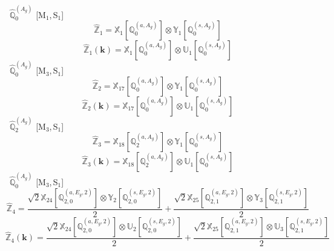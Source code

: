 \documentclass[fleqn,10pt,landscape]{article}
\begin{document}
\begin{itemize}
\vspace{4mm}
\noindent {} $\,\,\,\hat{\mathbb{Q}}_{0}^{(A_{g})}$ [M$_{1}$,\,S$_{1}$]
\begin{dmath*}
\hat{\mathbb{Z}}_{1}=\mathbb{X}_{1}[\mathbb{Q}_{0}^{(a,A_{g})}] \otimes\mathbb{Y}_{1}[\mathbb{Q}_{0}^{(s,A_{g})}]
\end{dmath*}
\begin{dmath*}
\hat{\mathbb{Z}}_{1}(\bm{k})=\mathbb{X}_{1}[\mathbb{Q}_{0}^{(a,A_{g})}] \otimes\mathbb{U}_{1}[\mathbb{Q}_{0}^{(s,A_{g})}]
\end{dmath*}
\vspace{4mm}
\noindent {} $\,\,\,\hat{\mathbb{Q}}_{0}^{(A_{g})}$ [M$_{3}$,\,S$_{1}$]
\begin{dmath*}
\hat{\mathbb{Z}}_{2}=\mathbb{X}_{17}[\mathbb{Q}_{0}^{(a,A_{g})}] \otimes\mathbb{Y}_{1}[\mathbb{Q}_{0}^{(s,A_{g})}]
\end{dmath*}
\begin{dmath*}
\hat{\mathbb{Z}}_{2}(\bm{k})=\mathbb{X}_{17}[\mathbb{Q}_{0}^{(a,A_{g})}] \otimes\mathbb{U}_{1}[\mathbb{Q}_{0}^{(s,A_{g})}]
\end{dmath*}
\vspace{4mm}
\noindent {} $\,\,\,\hat{\mathbb{Q}}_{2}^{(A_{g})}$ [M$_{3}$,\,S$_{1}$]
\begin{dmath*}
\hat{\mathbb{Z}}_{3}=\mathbb{X}_{18}[\mathbb{Q}_{2}^{(a,A_{g})}] \otimes\mathbb{Y}_{1}[\mathbb{Q}_{0}^{(s,A_{g})}]
\end{dmath*}
\begin{dmath*}
\hat{\mathbb{Z}}_{3}(\bm{k})=\mathbb{X}_{18}[\mathbb{Q}_{2}^{(a,A_{g})}] \otimes\mathbb{U}_{1}[\mathbb{Q}_{0}^{(s,A_{g})}]
\end{dmath*}
\vspace{4mm}
\noindent {} $\,\,\,\hat{\mathbb{Q}}_{0}^{(A_{g})}$ [M$_{3}$,\,S$_{1}$]
\begin{dmath*}
\hat{\mathbb{Z}}_{4}=\frac{\sqrt{2} \mathbb{X}_{24}[\mathbb{Q}_{2,0}^{(a,E_{g},2)}] \otimes\mathbb{Y}_{2}[\mathbb{Q}_{2,0}^{(s,E_{g},2)}]}{2} + \frac{\sqrt{2} \mathbb{X}_{25}[\mathbb{Q}_{2,1}^{(a,E_{g},2)}] \otimes\mathbb{Y}_{3}[\mathbb{Q}_{2,1}^{(s,E_{g},2)}]}{2}
\end{dmath*}
\begin{dmath*}
\hat{\mathbb{Z}}_{4}(\bm{k})=\frac{\sqrt{2} \mathbb{X}_{24}[\mathbb{Q}_{2,0}^{(a,E_{g},2)}] \otimes\mathbb{U}_{2}[\mathbb{Q}_{2,0}^{(s,E_{g},2)}]}{2} + \frac{\sqrt{2} \mathbb{X}_{25}[\mathbb{Q}_{2,1}^{(a,E_{g},2)}] \otimes\mathbb{U}_{3}[\mathbb{Q}_{2,1}^{(s,E_{g},2)}]}{2}

\end{dmath*}
\end{itemize}
\end{document}
